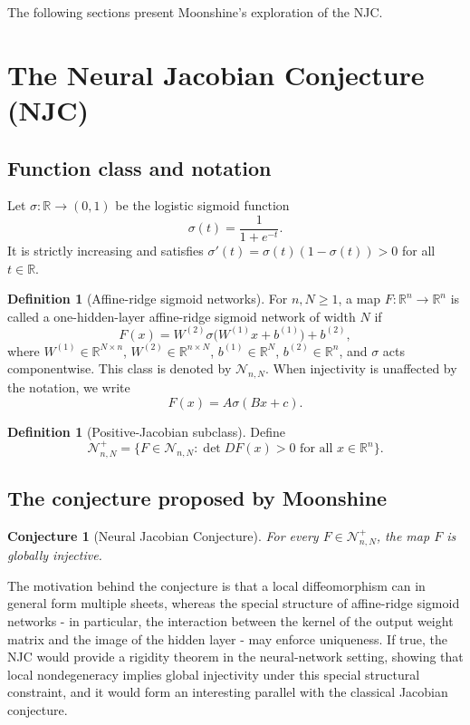 \documentclass[a4paper,11pt]{article}
\theoremstyle{plain}
\newtheorem{conjecture}[theorem]{Conjecture}
\theoremstyle{definition}
\newtheorem{definition}[theorem]{Definition}
\theoremstyle{remark}
\begin{document}
The following sections present Moonshine's exploration of the NJC.

\section{The Neural Jacobian Conjecture (NJC)}

\subsection{Function class and notation}

Let \(\sigma:\mathbb R\to(0,1)\) be the logistic sigmoid function
\[
\sigma(t)=\frac{1}{1+e^{-t}}.
\]
It is strictly increasing and satisfies \(\sigma'(t)=\sigma(t)(1-\sigma(t))>0\) for all \(t\in\mathbb R\).

\begin{definition}[Affine-ridge sigmoid networks]
For \(n,N\ge 1\), a map \(F:\mathbb R^n\to\mathbb R^n\) is called a one-hidden-layer affine-ridge sigmoid network of width \(N\) if
\[
F(x)=W^{(2)}\sigma\bigl(W^{(1)}x+b^{(1)}\bigr)+b^{(2)},
\]
where \(W^{(1)}\in\mathbb R^{N\times n}\), \(W^{(2)}\in\mathbb R^{n\times N}\), \(b^{(1)}\in\mathbb R^N\), \(b^{(2)}\in\mathbb R^n\), and \(\sigma\) acts componentwise. This class is denoted by \(\mathcal N_{n,N}\). When injectivity is unaffected by the notation, we write
\[
F(x)=A\sigma(Bx+c).
\]
\end{definition}

\begin{definition}[Positive-Jacobian subclass]
Define
\[
\mathcal N_{n,N}^+=\{F\in\mathcal N_{n,N}: \det DF(x)>0\text{ for all }x\in\mathbb R^n\}.
\]
\end{definition}

\subsection{The conjecture proposed by Moonshine}

\begin{conjecture}[Neural Jacobian Conjecture]
For every \(F\in\mathcal N_{n,N}^+\), the map \(F\) is globally injective.
\end{conjecture}

The motivation behind the conjecture is that a local diffeomorphism can in general form multiple sheets, whereas the special structure of affine-ridge sigmoid networks - in particular, the interaction between the kernel of the output weight matrix and the image of the hidden layer - may enforce uniqueness. If true, the NJC would provide a rigidity theorem in the neural-network setting, showing that local nondegeneracy implies global injectivity under this special structural constraint, and it would form an interesting parallel with the classical Jacobian conjecture.
\end{document}
